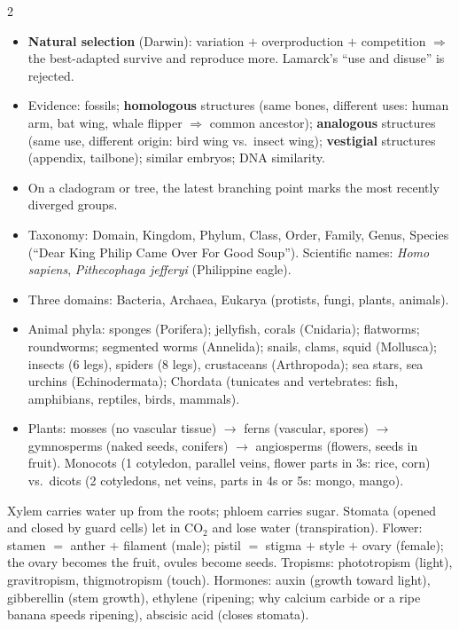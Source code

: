 \documentclass[10pt]{article}
\makeatletter
\newcommand{\sub}[1]{\par\vspace{2.5pt}{\sffamily\bfseries\color{dblue}#1}\par\nobreak\vspace{0.5pt}\@afterheading}
\newcommand{\term}[1]{\textbf{\color{dnavy}#1}}
\makeatother
\begin{document}
\begin{multicols}{2}
\sub{H. Evolution and classification}
\begin{itemize}
\item \term{Natural selection} (Darwin): variation $+$ overproduction $+$ competition $\Rightarrow$ the best-adapted survive and reproduce more. Lamarck's ``use and disuse'' is rejected.
\item Evidence: fossils; \term{homologous} structures (same bones, different uses: human arm, bat wing, whale flipper $\Rightarrow$ common ancestor); \term{analogous} structures (same use, different origin: bird wing vs.\ insect wing); \term{vestigial} structures (appendix, tailbone); similar embryos; DNA similarity.
\item On a cladogram or tree, the latest branching point marks the most recently diverged groups.
\item Taxonomy: Domain, Kingdom, Phylum, Class, Order, Family, Genus, Species (``Dear King Philip Came Over For Good Soup''). Scientific names: \emph{Homo sapiens}, \emph{Pithecophaga jefferyi} (Philippine eagle).
\item Three domains: Bacteria, Archaea, Eukarya (protists, fungi, plants, animals).
\item Animal phyla: sponges (Porifera); jellyfish, corals (Cnidaria); flatworms; roundworms; segmented worms (Annelida); snails, clams, squid (Mollusca); insects (6 legs), spiders (8 legs), crustaceans (Arthropoda); sea stars, sea urchins (Echinodermata); Chordata (tunicates and vertebrates: fish, amphibians, reptiles, birds, mammals).
\item Plants: mosses (no vascular tissue) $\to$ ferns (vascular, spores) $\to$ gymnosperms (naked seeds, conifers) $\to$ angiosperms (flowers, seeds in fruit). Monocots (1 cotyledon, parallel veins, flower parts in 3s: rice, corn) vs.\ dicots (2 cotyledons, net veins, parts in 4s or 5s: mongo, mango).
\end{itemize}

\sub{I. Plants}
Xylem carries water up from the roots; phloem carries sugar. Stomata (opened and closed by guard cells) let in CO$_2$ and lose water (transpiration). Flower: stamen $=$ anther $+$ filament (male); pistil $=$ stigma $+$ style $+$ ovary (female); the ovary becomes the fruit, ovules become seeds. Tropisms: phototropism (light), gravitropism, thigmotropism (touch). Hormones: auxin (growth toward light), gibberellin (stem growth), ethylene (ripening; why calcium carbide or a ripe banana speeds ripening), abscisic acid (closes stomata).


\end{multicols}
\end{document}
